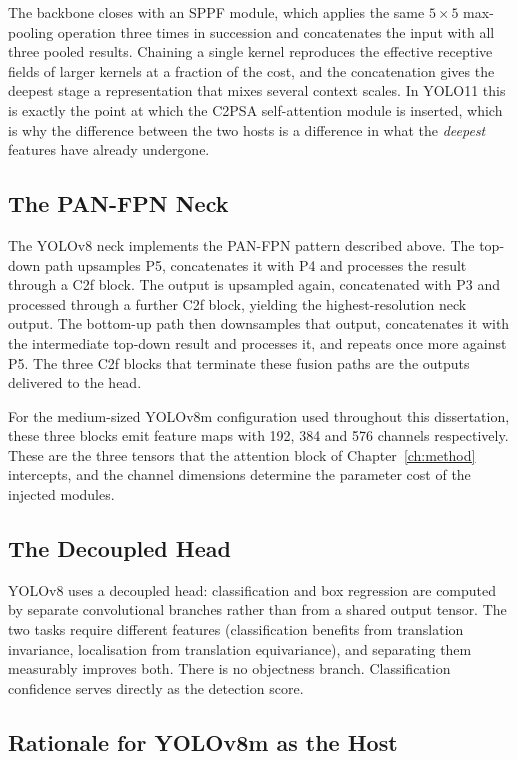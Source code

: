 \documentclass[MScCS]{uccthesis}
\begin{document}
The backbone closes with an SPPF module, which applies the same $5 \times 5$
max-pooling operation three times in succession and concatenates the input with
all three pooled results. Chaining a single kernel reproduces the effective
receptive fields of larger kernels at a fraction of the cost, and the
concatenation gives the deepest stage a representation that mixes several
context scales. In YOLO11 this is exactly the point at which the C2PSA
self-attention module is inserted, which is why the difference between the two
hosts is a difference in what the \emph{deepest} features have already
undergone.

\subsection{The PAN-FPN Neck}

The YOLOv8 neck implements the PAN-FPN pattern described above. The top-down
path upsamples P5, concatenates it with P4 and processes the result through a
C2f block. The output is upsampled again, concatenated with P3 and processed
through a further C2f block, yielding the highest-resolution neck output. The
bottom-up path then downsamples that output, concatenates it with the
intermediate top-down result and processes it, and repeats once more against
P5. The three C2f blocks that terminate these fusion paths are the outputs
delivered to the head.

For the medium-sized YOLOv8m configuration used throughout this dissertation,
these three blocks emit feature maps with 192, 384 and 576 channels
respectively. These are the three tensors that the attention block of
Chapter~\ref{ch:method} intercepts, and the channel dimensions determine the
parameter cost of the injected modules.

\subsection{The Decoupled Head}

YOLOv8 uses a decoupled head: classification and box regression are computed by
separate convolutional branches rather than from a shared output tensor. The
two tasks require different features (classification benefits from
translation invariance, localisation from translation equivariance), and
separating them measurably improves both. There is no objectness branch.
Classification confidence serves directly as the detection score.

\subsection{Rationale for YOLOv8m as the Host}
\end{document}
